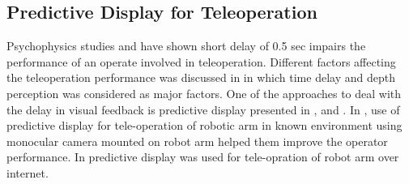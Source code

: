 \documentclass[12pt,a4paper, notitlepage]{article}
\begin{document}
\subsection{Predictive Display for  Teleoperation }
Psychophysics studies \cite{miall1993intermittency} and \cite{miall1985visuomotor} have shown short delay of 0.5 sec impairs the performance of an operate involved in teleoperation. Different factors affecting the teleoperation performance was discussed in \cite{chen2007human} in which time delay and depth perception was considered as major factors. One of the approaches to deal with the delay in visual feedback is predictive display presented in  \cite{deng2003predictive}, \cite{arai2016development} and \cite{bejczy1991role}. In \cite{deng2003predictive}, use of predictive display for  tele-operation of robotic arm in known environment using monocular camera mounted on robot arm helped them improve the operator performance. In \cite{arai2016development} predictive display was used for tele-opration of robot arm over internet.
\end{document}
